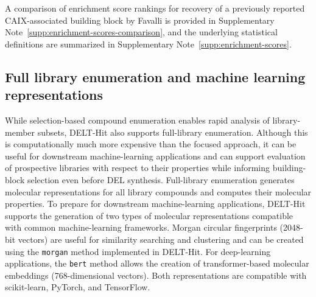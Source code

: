 

A comparison of enrichment score rankings for recovery of a previously reported CAIX-associated building block by Favalli \cite{favalli_stereoregiodefineddnaencoded_2021} is provided in Supplementary Note~\ref{supp:enrichment-scores-comparison}, and the underlying statistical definitions are summarized in Supplementary Note~\ref{supp:enrichment-scores}.

\subsection{Full library enumeration and machine learning representations}

While selection-based compound enumeration enables rapid analysis of library-member subsets, DELT-Hit also supports full-library enumeration. Although this is computationally much more expensive than the focused approach, it can be useful for downstream machine-learning applications and can support evaluation of prospective libraries with respect to their properties while informing building-block selection even before DEL synthesis. Full-library enumeration generates molecular representations for all library compounds and computes their molecular properties. To prepare for downstream machine-learning applications, DELT-Hit supports the generation of two types of molecular representations compatible with common machine-learning frameworks. Morgan circular fingerprints (2048-bit vectors) are useful for similarity searching and clustering and can be created using the \texttt{morgan} method implemented in DELT-Hit. For deep-learning applications, the \texttt{bert} method allows the creation of transformer-based molecular embeddings (768-dimensional vectors). Both representations are compatible with scikit-learn, PyTorch, and TensorFlow.
